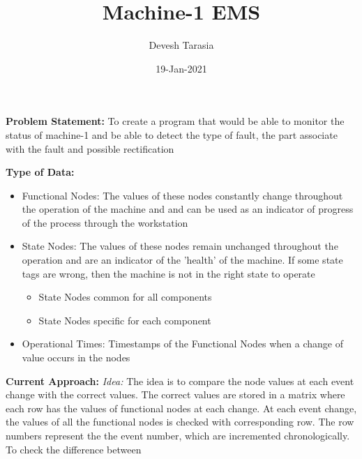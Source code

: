 \documentclass[11pt]{article}
\title{Machine-1 EMS}
\author{Devesh Tarasia}
\date{19-Jan-2021}
\begin{document}
  \maketitle%
  \vspace{0.2cm}
  \textbf{Problem Statement:}\newline
  To create a program that would be able to monitor the status of machine-1 and be able to detect the type of 
  fault, the part associate with the fault and possible rectification\newline

  
  \textbf{Type of Data:}
  \vspace{-2mm}
  \begin{itemize}
    \setlength\itemsep{0em}
    \item Functional Nodes: The values of these nodes constantly change throughout the operation of the machine 
    and and can be used as an indicator of progress of the process through the workstation
    \item State Nodes: The values of these nodes remain unchanged throughout the operation and are an indicator
    of the 'health' of the machine. If some state tags are wrong, then the machine is not in the right state to
    operate
    \begin{itemize}
      \itemsep0em
      \item State Nodes common for all components
      \item State Nodes specific for each component
    \end{itemize}
    \item Operational Times: Timestamps of the Functional Nodes when a change of value occurs in the nodes
  \end{itemize}
  \textbf{Current Approach:}\newline
  \textit{Idea:}\newline
  The idea is to compare the node values at each event change with the correct values. The correct values are stored in a matrix
  where each row has the values of functional nodes at each change.\newline
  At each event change, the values of all the functional nodes is checked with corresponding row. The row numbers represent the
  the event number, which are incremented chronologically.\newline
  To check the difference between 
\end{document}
